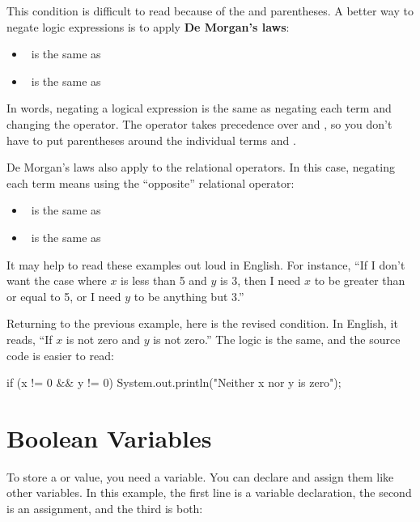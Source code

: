 
This condition is difficult to read because of the \java{!} and parentheses.
A better way to negate logic expressions is to apply {\bf De Morgan's laws}:

\begin{itemize}
\item {} ~is the same as~ 
\item {} ~is the same as~ 
\end{itemize}

In words, negating a logical expression is the same as negating each term and changing the operator.
The \java{!} operator takes precedence over \java{&&} and \java{||}, so you don't have to put parentheses around the individual terms  and .

De Morgan's laws also apply to the relational operators.
In this case, negating each term means using the ``opposite'' relational operator:

\begin{itemize}
\item {} ~is the same as~ 
\item {} ~is the same as~ 
\end{itemize}

It may help to read these examples out loud in English.
For instance, ``If I don't want the case where $x$ is less than 5 and $y$ is 3, then I need $x$ to be greater than or equal to 5, or I need $y$ to be anything but 3.''

Returning to the previous example, here is the revised condition.
In English, it reads, ``If $x$ is not zero and $y$ is not zero.''
The logic is the same, and the source code is easier to read:

\begin{code}
if (x != 0 && y != 0) {
    System.out.println("Neither x nor y is zero");
}
\end{code}


\section{Boolean Variables}


To store a  or  value, you need a  variable.
You can declare and assign them like other variables.
In this example, the first line is a variable declaration, the second is an assignment, and the third is both:


